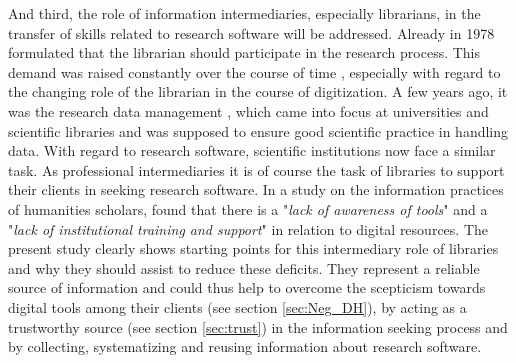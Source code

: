 \documentclass[12pt, a4paper, titlepage, oneside, abstract=true, toc=listof, toc=bibliography, BCOR=1cm]{scrreprt}
\begin{document}
{%
And third, the role of information intermediaries, especially librarians, in the transfer of skills related to research software will be addressed. Already in 1978 \citet{Gunning1978} formulated that the librarian should participate in the research process. This demand was raised constantly over the course of time \citep{Buddenbohm2017, Case2008, Cunningham2010, Koltay2016, MonroeGulick2013, Rothfritz2018, Warwick2008}, especially with regard to the changing role of the librarian in the course of digitization. A few years ago, it was the research data management \citep{Coates2014}, which came into focus at universities and scientific libraries and was supposed to ensure good scientific practice in handling data. With regard to research software, scientific institutions now face a similar task. As professional intermediaries \citep{Edmond2005} it is of course the task of libraries to support their clients in seeking research software. In a study on the information practices of humanities scholars, \citep[p. 73]{Bulger2011} found that there is a "\textit{lack of awareness of tools}" and a "\textit{lack of institutional training and support}" in relation to digital resources. The present study clearly shows starting points for this intermediary role of libraries and why they should assist to reduce these deficits. They represent a reliable source of information and could thus help to overcome the scepticism towards digital tools among their clients (see section \ref{sec:Neg_DH}), by acting as a trustworthy source (see section \ref{sec:trust}) in the information seeking process and by collecting, systematizing and reusing information about research software.

}
\end{document}
